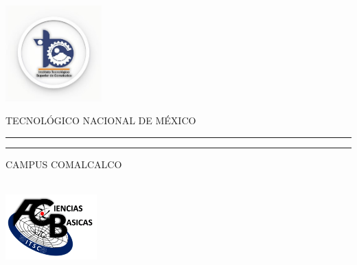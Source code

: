 \documentclass[12pt,a4paper]{report}
\begin{document}
	
	\begin{titlepage}
		\begin{minipage}[c][0.17\textheight][c]{0.25\textwidth}
			\begin{center}
				\includegraphics[width=3.7cm, height=3.7cm]{LOGOTEC}
			\end{center}
		\end{minipage}
		\begin{minipage}[c][0.195\textheight][t]{0.75\textwidth}
			\begin{center}
				\vspace{0.3cm}
				\textsc{\large TECNOLÓGICO NACIONAL DE MÉXICO}\\[0.5cm]
				\vspace{0.3cm}
				{\color{azulmarino}\hrule height2.5pt}
				\vspace{.2cm}
				{\color{azulmarino}\hrule height1pt}
				\vspace{.8cm}
				\textsc{CAMPUS COMALCALCO}\\[0.5cm]
			\end{center}
		\end{minipage}
		
		\begin{minipage}[c][0.81\textheight][t]{0.25\textwidth}
			\vspace*{5mm}
			\begin{center}
				\hskip2.0mm
				{\color{azulmarino}\vrule width1pt height13cm}
				\vspace{5mm}
				\hskip2pt
				{\color{azulmarino}\vrule width2.5pt height13cm}
				\hskip2mm
				{\color{azulmarino}\vrule width1pt height13cm} \\ 
				\vspace{5mm}
				\includegraphics[height=2.5cm]{logob}
			\end{center}
		\end{minipage}
		\begin{minipage}[c][0.81\textheight][t]{0.75\textwidth}
			\begin{center}
				\vspace{0.5cm}
				

\end{center}
\end{minipage}
\end{titlepage}
\end{document}
